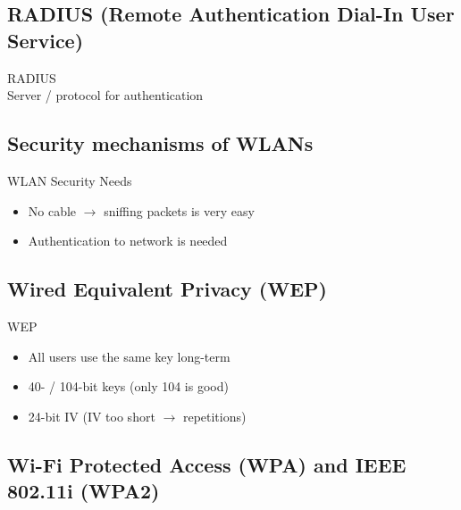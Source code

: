 \subsection{RADIUS (Remote Authentication Dial-In User Service)}

\begin{definition}{RADIUS}\\
    Server / protocol for authentication
\end{definition}


\subsection{Security mechanisms of WLANs}

\begin{concept}{WLAN Security Needs}\\
    \begin{itemize}
        \item No cable $\rightarrow$ sniffing packets is very easy
        \item Authentication to network is needed
    \end{itemize}
\end{concept}

\subsection{Wired Equivalent Privacy (WEP)}

\begin{definition}{WEP}\\
    \begin{itemize}
        \item All users use the same key long-term
        \item 40- / 104-bit keys (only 104 is good)
        \item 24-bit IV (IV too short $\rightarrow$ repetitions)
    \end{itemize}
\end{definition}


\subsection{Wi-Fi Protected Access (WPA) and IEEE 802.11i (WPA2)}

